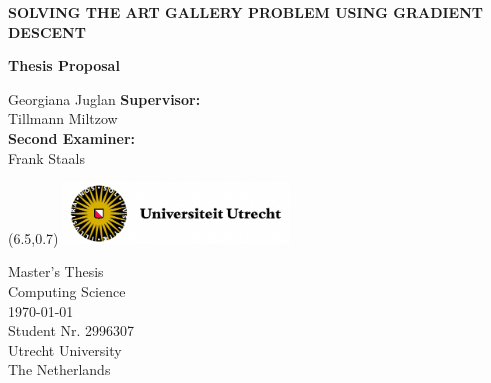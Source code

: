 \documentclass{article}
\begin{document}
\nocite{*} %

\thispagestyle{empty} 
\begin{center}
    \vspace*{0.5cm}
    \huge
    \textbf{SOLVING THE ART GALLERY PROBLEM USING GRADIENT DESCENT}

    \vspace*{0.4cm}
    \textbf{Thesis Proposal }
    \vspace*{2cm}




    \vspace{-1cm}
    \LARGE
    Georgiana Juglan
    \vfill 
    \large    
    \textbf{Supervisor:} \\
    Tillmann Miltzow \\
    \textbf{Second Examiner:} \\
    Frank Staals \\
     
\end{center}
   

\begin{textblock}{3}(6.5,0.7)
\includegraphics[width = 6cm]{Figures/UU logo.png}
\end{textblock}

\begin{flushleft}
    \vspace{0.5cm}
    Master's Thesis \\
    Computing Science\\
    \today\\
    Student Nr. 2996307 \\
    Utrecht University\\
    The Netherlands
\end{flushleft}

\newpage
\thispagestyle{empty}

\thispagestyle{empty}
\tableofcontents
\thispagestyle{empty}



% 
% 
% 

\renewcommand{\headrulewidth}{0pt}%
\fancyhead{}%




%
\end{document}
